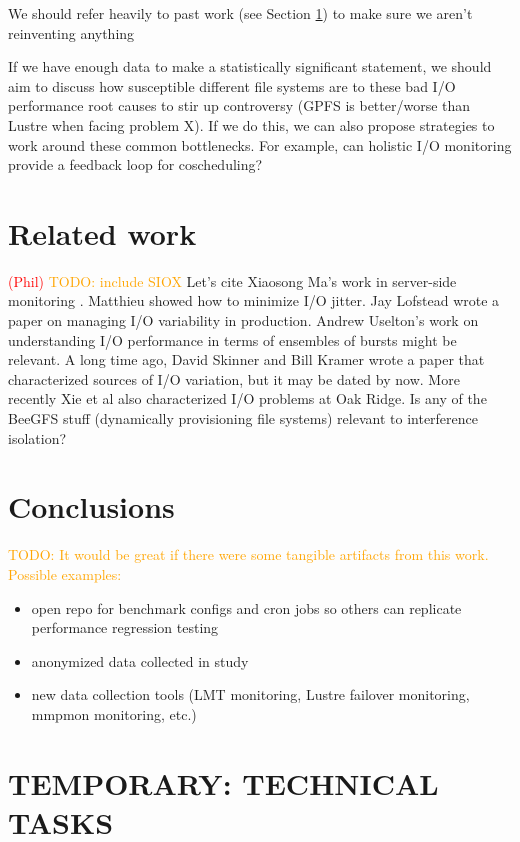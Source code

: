 \documentclass[conference,10pt,compsocconf]{IEEEtran}
\newcommand{\assign}[1]{\textcolor{red}{(#1)}}
\newcommand{\todo}[1]{\textcolor{Orange}{TODO: #1}}
\begin{document}
We should refer heavily to past work (see Section \ref{related}) to make sure we
aren't reinventing anything

If we have enough data to make a statistically significant statement, we should
aim to discuss how susceptible different file systems are to these bad I/O
performance root causes to stir up controversy (GPFS is better/worse than
Lustre when facing problem X).  If we do this, we can also propose strategies
to work around these common bottlenecks.  For example, can holistic I/O
monitoring provide a feedback loop for coscheduling?

\section{Related work} \label{related}

\assign{Phil} \todo{include SIOX} Let's cite Xiaosong Ma's work in server-side
monitoring \cite{Liu2016}.  Matthieu showed how to
minimize I/O jitter\cite{Dorier2012}.  Jay Lofstead wrote a paper on managing
I/O variability in production\cite{Lofstead2010}.  Andrew Uselton's work on
understanding I/O performance in terms of ensembles of bursts might be
relevant\cite{Uselton2010}.  A long time ago, David Skinner and Bill Kramer
wrote a paper that characterized sources of I/O variation, but it may be dated
by now\cite{Skinner2005}.  More recently Xie et al also characterized I/O
problems at Oak Ridge\cite{Xie2012}.  Is any of the BeeGFS stuff (dynamically
provisioning file systems) relevant to interference isolation?

\section{Conclusions}

\todo{It would be great if there were some tangible artifacts from this work.
Possible examples:}
\begin{itemize}
\item open repo for benchmark configs and cron jobs so others can replicate
performance regression testing
\item anonymized data collected in study
\item new data collection tools (LMT monitoring, Lustre failover monitoring,
mmpmon monitoring, etc.)
\end{itemize}

\section{TEMPORARY: TECHNICAL TASKS}
\end{document}
